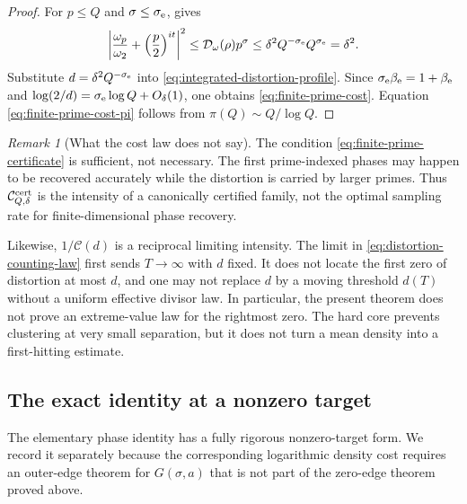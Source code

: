 \documentclass[11pt]{article}
\theoremstyle{definition}
\theoremstyle{remark}
\newtheorem{remark}[theorem]{Remark}
\begin{document}
\begin{proof}
For $p\leq Q$ and $\sigma\leq\sigma_{\rm e}$,
 gives
\[
 \left|\frac{\omega_p}{\omega_2}
       +\left(\frac p2\right)^{it}\right|^2
 \leq \mathcal D_\omega(\rho)p^\sigma
 \leq\delta^2Q^{-\sigma_{\rm e}}Q^{\sigma_{\rm e}}
 =\delta^2.
\]
Substitute $d=\delta^2Q^{-\sigma_{\rm e}}$ into
\eqref{eq:integrated-distortion-profile}.  Since
$\sigma_{\rm e}\beta_{\rm e}=1+\beta_{\rm e}$ and
$\log(2/d)=\sigma_{\rm e}\log Q+O_\delta(1)$, one obtains
\eqref{eq:finite-prime-cost}.  Equation
\eqref{eq:finite-prime-cost-pi} follows from
$\pi(Q)\sim Q/\log Q$.
\end{proof}

\begin{remark}[What the cost law does not say]
\label{rem:not-first-hit}
The condition \eqref{eq:finite-prime-certificate} is sufficient, not
necessary.  The first prime-indexed phases may happen to be recovered accurately while
the distortion is carried by larger primes.  Thus
$\mathcal C_{Q,\delta}^{\rm cert}$ is the intensity of a canonically
certified family, not the optimal sampling rate for finite-dimensional phase
recovery.

Likewise, $1/\mathcal C(d)$ is a reciprocal limiting intensity.  The limit in
\eqref{eq:distortion-counting-law} first sends $T\to\infty$ with $d$ fixed.
It does not locate the first zero of distortion at most $d$, and one may not
replace $d$ by a moving threshold $d(T)$ without a uniform effective divisor
law.  In particular, the present theorem does not prove an extreme-value law
for the rightmost zero.  The hard core prevents clustering at very small
separation, but it does not turn a mean density into a first-hitting estimate.
\end{remark}

\subsection{The exact identity at a nonzero target}
\label{subsec:nonzero-a-distortion}

The elementary phase identity has a fully rigorous nonzero-target form.  We
record it separately because the corresponding logarithmic density cost
requires an outer-edge theorem for $G(\sigma,a)$ that is not part of the
zero-edge theorem proved above.
\end{document}
